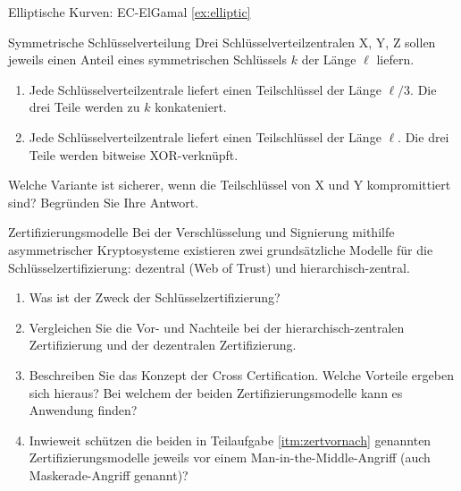 \documentclass{article}
\begin{document}
\begin{exercise}{Elliptische Kurven: EC-ElGamal \ref{ex:elliptic}}\end{exercise}


\setcounter{subsection}{70}
\begin{exercise}{Symmetrische Schlüsselverteilung}
  Drei Schlüsselverteilzentralen X, Y, Z sollen jeweils einen Anteil eines symmetrischen Schlüssels $k$ der Länge $\ell$ liefern.
  \begin{enumerate}
    \item Jede Schlüsselverteilzentrale liefert einen Teilschlüssel der Länge $\ell/3$. Die drei Teile werden zu $k$ konkateniert.
    \item Jede Schlüsselverteilzentrale liefert einen Teilschlüssel der Länge $\ell$. Die drei Teile werden bitweise XOR-verknüpft.
  \end{enumerate}
  Welche Variante ist sicherer, wenn die Teilschlüssel von X und Y kompromittiert sind? Begründen Sie Ihre Antwort.

  \begin{solution}
  \end{solution}
\end{exercise}

\begin{exercise}{Zertifizierungsmodelle}
  Bei der Verschlüsselung und Signierung mithilfe asymmetrischer Kryptosysteme existieren zwei grundsätzliche Modelle für die Schlüsselzertifizierung: dezentral (Web of Trust) und hierarchisch-zentral.
  \begin{enumerate}
    \item Was ist der Zweck der Schlüsselzertifizierung?
    \item\label{itm:zertvornach} Vergleichen Sie die Vor- und Nachteile bei der hierarchisch-zentralen Zertifizierung und der dezentralen Zertifizierung.
    \item Beschreiben Sie das Konzept der Cross Certification. Welche Vorteile ergeben sich hieraus? Bei welchem der beiden Zertifizierungsmodelle kann es Anwendung finden?
    \item Inwieweit schützen die beiden in Teilaufgabe \ref{itm:zertvornach} genannten Zertifizierungsmodelle jeweils vor einem Man-in-the-Middle-Angriff (auch Maskerade-Angriff genannt)?
  \end{enumerate}

  \begin{solution}
  \end{solution}
\end{exercise}
\end{document}
